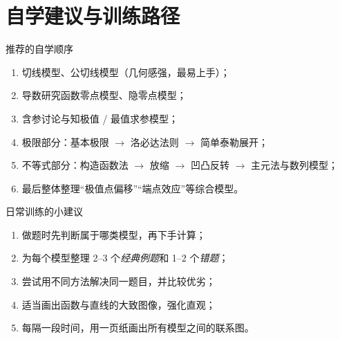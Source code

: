 \documentclass[a4paper,11pt]{ctexart}
\begin{document}
\section{自学建议与训练路径}

\begin{summarybox}{推荐的自学顺序}
  \begin{enumerate}
    \item 切线模型、公切线模型（几何感强，最易上手）；
    \item 导数研究函数零点模型、隐零点模型；
    \item 含参讨论与知极值 / 最值求参模型；
    \item 极限部分：基本极限 $\rightarrow$ 洛必达法则 $\rightarrow$ 简单泰勒展开；
    \item 不等式部分：构造函数法 $\rightarrow$ 放缩 $\rightarrow$ 凹凸反转
      $\rightarrow$ 主元法与数列模型；
    \item 最后整体整理“极值点偏移”“端点效应”等综合模型。
  \end{enumerate}
\end{summarybox}

\begin{notebox}{日常训练的小建议}
  \begin{enumerate}
    \item 做题时先判断属于哪类模型，再下手计算；
    \item 为每个模型整理 2–3 个\emph{经典例题}和 1–2 个\emph{错题}；
    \item 尝试用不同方法解决同一题目，并比较优劣；
    \item 适当画出函数与直线的大致图像，强化直观；
    \item 每隔一段时间，用一页纸画出所有模型之间的联系图。
  \end{enumerate}
\end{notebox}
\end{document}
